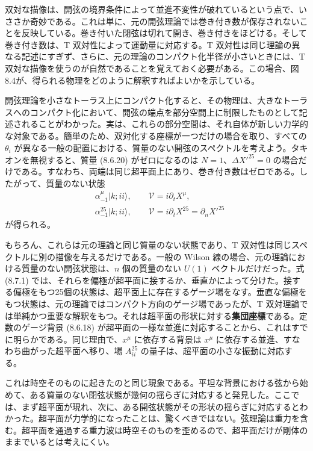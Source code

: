 双対な描像は、開弦の境界条件によって並進不変性が破れているという点で、いささか奇妙である。これは単に、元の開弦理論では巻き付き数が保存されないことを反映している。巻き付いた閉弦は切れて開き、巻き付きをほどける。そして巻き付き数は、T 双対性によって運動量に対応する。T 双対性は同じ理論の異なる記述にすぎず、さらに、元の理論のコンパクト化半径が小さいときには、T 双対な描像を使うのが自然であることを覚えておく必要がある。この場合、図8.4が、得られる物理をどのように解釈すればよいかを示している。

\label{sec:8.7}

開弦理論を小さなトーラス上にコンパクト化すると、その物理は、大きなトーラスへのコンパクト化において、開弦の端点を部分空間上に制限したものとして記述されることがわかった。実は、これらの部分空間は、それ自体が新しい力学的な対象である。簡単のため、双対化する座標が一つだけの場合を取り、すべての $\theta_i$ が異なる一般の配置における、質量のない開弦のスペクトルを考えよう。タキオンを無視すると、質量 (8.6.20) がゼロになるのは $N=1$、$\Delta X'^{25}=0$ の場合だけである。すなわち、両端は同じ超平面上にあり、巻き付き数はゼロである。したがって、質量のない状態
\begin{align}
&\alpha_{-1}^\mu|k;ii\rangle,\qquad
\mathcal V=i\partial_tX^\mu,
\tag{8.7.1a}\label{eq:8.7.1a}\\
&\alpha_{-1}^{25}|k;ii\rangle,\qquad
\mathcal V=i\partial_tX^{25}=\partial_nX'^{25}
\tag{8.7.1b}\label{eq:8.7.1b}
\end{align}
が得られる。

もちろん、これらは元の理論と同じ質量のない状態であり、T 双対性は同じスペクトルに別の描像を与えるだけである。一般の Wilson 線の場合、元の理論における質量のない開弦状態は、$n$ 個の質量のない $U(1)$ ベクトルだけだった。式 (8.7.1) では、それらを偏極が超平面に接するか、垂直かによって分けた。接する偏極をもつ25個の状態は、超平面上に存在するゲージ場をなす。垂直な偏極をもつ状態は、元の理論ではコンパクト方向のゲージ場であったが、T 双対理論では単純かつ重要な解釈をもつ。それは超平面の形状に対する\textbf{集団座標}である。定数のゲージ背景 (8.6.18) が超平面の一様な並進に対応することから、これはすでに明らかである。同じ理由で、$x^\mu$ に依存する背景は $x^\mu$ に依存する並進、すなわち曲がった超平面へ移り、場 $A_{ii}^{25}$ の量子は、超平面の小さな振動に対応する。

これは時空そのものに起きたのと同じ現象である。平坦な背景における弦から始めて、ある質量のない閉弦状態が幾何の揺らぎに対応すると発見した。ここでは、まず超平面が現れ、次に、ある開弦状態がその形状の揺らぎに対応するとわかった。超平面が力学的になったことは、驚くべきではない。弦理論は重力を含む。超平面を通過する重力波は時空そのものを歪めるので、超平面だけが剛体のままでいるとは考えにくい。

